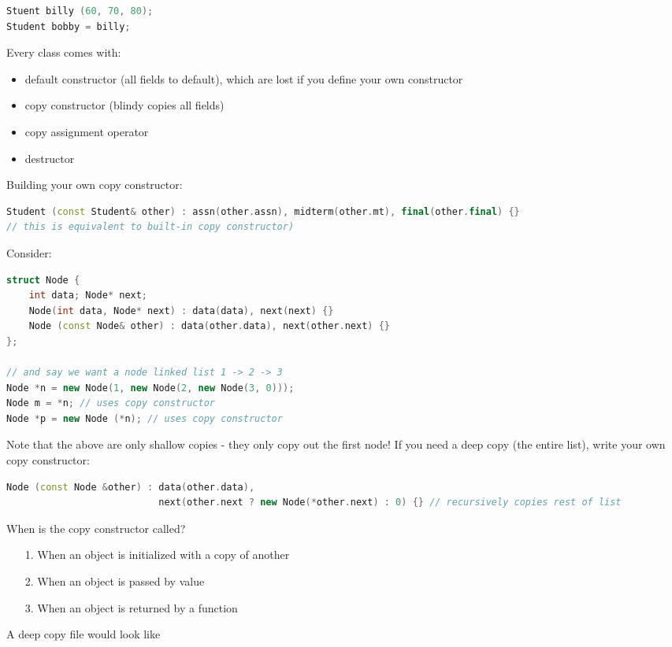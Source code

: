 \documentclass[english, 11pt]{article}
\begin{document}
\begin{lstlisting}[language=c++]
Stuent billy (60, 70, 80);
Student bobby = billy;
\end{lstlisting}
Every class comes with:
\begin{itemize}
  \item default constructor (all fields to default), which are lost if you define your own constructor
  \item copy constructor (blindy copies all fields)
  \item copy assignment operator
  \item destructor
\end{itemize}
Building your own copy constructor:
\begin{lstlisting}[language=c++]
Student (const Student& other) : assn(other.assn), midterm(other.mt), final(other.final) {}
// this is equivalent to built-in copy constructor)
\end{lstlisting}
Consider:
\begin{lstlisting}[language=c++]
struct Node {
    int data; Node* next;
    Node(int data, Node* next) : data(data), next(next) {}
    Node (const Node& other) : data(other.data), next(other.next) {}
};

// and say we want a node linked list 1 -> 2 -> 3
Node *n = new Node(1, new Node(2, new Node(3, 0)));
Node m = *n; // uses copy constructor
Node *p = new Node (*n); // uses copy constructor
\end{lstlisting}
Note that the above are only shallow copies - they only copy out the first node!
If you need a deep copy (the entire list), write your own copy constructor:
\begin{lstlisting}[language=c++]
Node (const Node &other) : data(other.data),
                           next(other.next ? new Node(*other.next) : 0) {} // recursively copies rest of list
\end{lstlisting}
When is the copy constructor called?
\begin{itemize}
  \item[1.] When an object is initialized with a copy of another
  \item[2.] When an object is passed by value
  \item[3.] When an object is returned by a function
\end{itemize}
A deep copy file would look like
\end{document}
